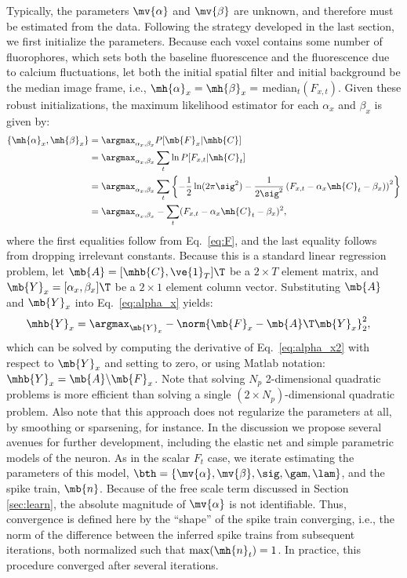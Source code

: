 Typically, the parameters  $\mv{\alpha}$ and $\mv{\beta}$ are unknown, and therefore must be estimated from the data.  Following the strategy developed in the last section, we first initialize the parameters.   Because each voxel contains some number of fluorophores, which sets both the baseline fluorescence and the fluorescence due to calcium fluctuations, let both the initial spatial filter and initial background be the median image frame, i.e., $\mh{\alpha}_x=\mh{\beta}_x=$ median$_t(F_{x,t})$.  Given these robust initializations, the maximum likelihood estimator for each $\alpha_x$ and $\beta_x$ is given by:
\begin{subequations} \label{eq:valpha_x}
\begin{align}
\{\mh{\alpha}_x,\mh{\beta}_x\} 
	&= \argmax_{\alpha_x,\beta_x} P[\mb{F}_x | \mhb{C}] \\
	&= \argmax_{\alpha_x,\beta_x} \sum_t \ln P[F_{x,t} | \mh{C}_t] \\
	&=\argmax_{\alpha_x,\beta_x} \sum_t  \left\{-\frac{1}{2} \ln (2\pi \sig^2) - \frac{1}{2\sig^2}\left(F_{x,t} - \alpha_x \mh{C}_t - \beta_x)\right)^2 \right\} \\
	&= \argmax_{\alpha_x,\beta_x} - \sum_t  (F_{x,t} - \alpha_x \mh{C}_t - \beta_x)^2, \label{eq:alpha_x}
\end{align}
\end{subequations}
where the first equalities follow from Eq.~\eqref{eq:F}, and the last equality follows from dropping irrelevant constants.  Because this is a standard linear regression problem, let $\mb{A}=[\mhb{C}, \ve{1}_T]\T$ be a $2\times T$ element matrix, and $\mb{Y}_x=[\alpha_x, \beta_x]\T$ be a $2\times 1$ element column vector.  Substituting $\mb{A}$ and $\mb{Y}_x$ into Eq.~\eqref{eq:alpha_x} yields:
\begin{align}
\mhb{Y}_x &= \argmax_{\mb{Y}_x} - \norm{\mb{F}_{x} - \mb{A}\T \mb{Y}_x}_2^2, \label{eq:alpha_x2}
\end{align}
which can be solved by computing the derivative of Eq.~\eqref{eq:alpha_x2} with respect to $\mb{Y}_x$ and setting to zero, or using Matlab notation: $\mhb{Y}_x = \mb{A} \backslash \mb{F}_x$.  Note that solving $N_p$ 2-dimensional quadratic problems is more efficient than solving a single $(2 \times N_p)$-dimensional quadratic problem.  Also note that this approach does not regularize the parameters at all, by smoothing or sparsening, for instance.  In the discussion we propose several avenues for further development, including the elastic net \cite{ZouHastie05} and simple parametric models of the neuron.   As in the scalar $F_t$ case, we iterate estimating the parameters of this model, $\bth = \{\mv{\alpha}, \mv{\beta}, \sig, \gam, \lam\}$, and the spike train, $\mb{n}$.  Because of the free scale term discussed in Section \ref{sec:learn}, the absolute magnitude of $\mv{\alpha}$ is not identifiable.  Thus, convergence is defined here by the ``shape'' of the spike train converging, i.e., the norm of the difference between the inferred spike trains from subsequent iterations, both normalized such that $\max(\mh{n}_t)=1$.  In practice, this procedure converged after several iterations.



